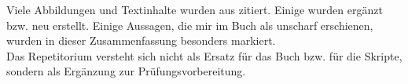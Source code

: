 \Hinweise

\noindent
Viele Abbildungen und Textinhalte wurden aus \cite[]{Oec22} zitiert.
Einige wurden ergänzt bzw. neu erstellt.
Einige Aussagen, die mir im Buch als unscharf erschienen, wurden in dieser Zusammenfassung besonders markiert.\\

\noindent
Das Repetitorium versteht sich nicht als Ersatz für das Buch bzw. für die Skripte, sondern als Ergänzung zur Prüfungsvorbereitung.\\
